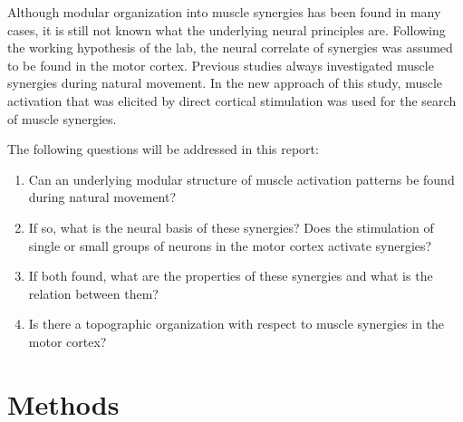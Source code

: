 \documentclass[]{article}
\begin{document}
Although modular organization into muscle synergies has been found in many cases, it is still not known what the underlying neural principles are. Following the working hypothesis of the lab, the neural correlate of synergies was assumed to be found in the motor cortex. Previous studies always investigated muscle synergies during natural movement. In the new approach of this study, muscle activation that was elicited by direct cortical stimulation was used for the search of muscle synergies.


\bigskip

The following questions will be addressed in this report:

\begin{enumerate}
	\item Can an underlying modular structure of muscle activation patterns be found during natural movement?
	\item If so, what is the neural basis of these synergies? Does the stimulation of single or small groups of neurons in the motor cortex activate synergies?
	\item If both found, what are the properties of these synergies and what is the relation between them?
	\item Is there a topographic organization with respect to muscle synergies in the motor cortex?
\end{enumerate}
	



\section{Methods} %
\label{sg:sec:methods}












\listoftodos



\end{document}
